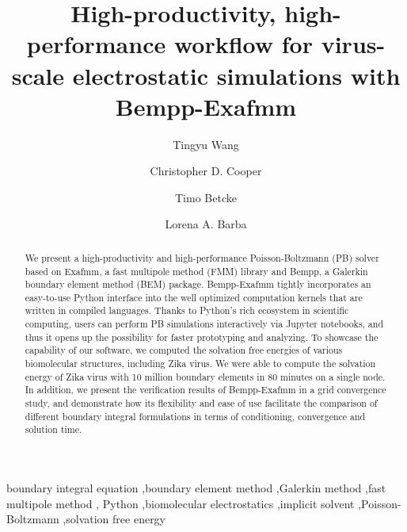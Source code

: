 \documentclass[final,5p,times,twocolumn]{elsarticle}
\begin{document}
\begin{frontmatter}
\title{High-productivity, high-performance workflow for virus-scale electrostatic simulations with Bempp-Exafmm}

\author[gwu]{Tingyu Wang}

\author[usm]{Christopher D. Cooper}

\author[ucl]{Timo Betcke}

\author[gwu]{Lorena A. Barba}

\address[gwu]{Department of Mechanical and Aerospace Engineering, The George Washington University, Washington DC}
\address[usm]{Department of Mechanical Engineering, Universidad T\'ecnica Federico Santa Mar\'ia, Valpara\'iso, Chile}
\address[ucl]{Department of Mathematics, University College London, UK}

\begin{abstract}
    We present a high-productivity and high-performance Poisson-Boltzmann (PB) solver based on Exafmm, a fast multipole method (FMM) library and Bempp, a Galerkin boundary element method (BEM) package.
    Bempp-Exafmm tightly incorporates an easy-to-use Python interface into the well optimized computation kernels that are written in compiled languages.
    Thanks to Python's rich ecosystem in scientific computing, users can perform PB simulations interactively via Jupyter notebooks, and thus it opens up the possibility for faster prototyping and analyzing.
    To showcase the capability of our software, we computed the solvation free energies of various biomolecular structures, including Zika virus.
    We were able to compute the solvation energy of Zika virus with 10 million boundary elements in 80 minutes on a single node.
    In addition, we present the verification results of Bempp-Exafmm in a grid convergence study, and demonstrate how its flexibility and ease of use facilitate the comparison of different boundary integral formulations in terms of conditioning, convergence and solution time.
\end{abstract}

\begin{keyword}
    boundary integral equation \sep boundary element method \sep Galerkin method \sep fast multipole method \sep
    Python \sep biomolecular electrostatics \sep implicit solvent \sep Poisson-Boltzmann \sep solvation free energy
\end{keyword}

\end{frontmatter}
\end{document}
